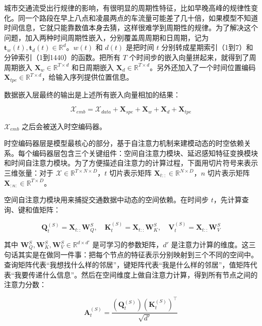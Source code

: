 城市交通流受出行规律的影响，有很明显的周期性特征，比如早晚高峰的规律性变化。同一个路段在早上八点和凌晨两点的车流量可能差了几十倍，如果模型不知道时间信息，它就只能靠数值本身去猜，这样很难学到周期性的规律。为了解决这个问题，加入两种时间周期性嵌入，分别覆盖周周期和日周期，记为 $\boldsymbol{t}_w(t), \boldsymbol{t}_d(t) \in \mathbb{R}^d$。$w(t)$ 和 $d(t)$ 是把时间 $t$ 分别转成星期索引（1到7）和分钟索引（1到1440）的函数。把所有 $T$ 个时间步的嵌入向量拼起来，就得到了周周期嵌入 $\boldsymbol{X}_w \in \mathbb{R}^{T \times d}$ 和日周期嵌入 $\boldsymbol{X}_d \in \mathbb{R}^{T \times d}$。另外还加入了一个时间位置编码 $\boldsymbol{X}_{tpe} \in \mathbb{R}^{T \times d}$，给输入序列提供位置信息。

数据嵌入层最终的输出是上述所有嵌入向量相加的结果：

\begin{equation}
\mathcal{X}_{emb} = \mathcal{X}_{data} + \boldsymbol{X}_{spe} + \boldsymbol{X}_w + \boldsymbol{X}_d + \boldsymbol{X}_{tpe}
\end{equation}

$\mathcal{X}_{emb}$ 之后会被送入时空编码器。

时空编码器层是模型最核心的部分，基于自注意力机制来建模动态的时空依赖关系。每个编码器层包含三个关键组件：空间自注意力模块、延迟感知特征变换模块和时间自注意力模块。为了方便描述自注意力的计算过程，下面用切片符号来表示三维张量：对于 $\mathcal{X} \in \mathbb{R}^{T \times N \times D}$，$t$ 切片表示矩阵 $\boldsymbol{X}_{t::} \in \mathbb{R}^{N \times D}$，$n$ 切片表示矩阵 $\boldsymbol{X}_{:n:} \in \mathbb{R}^{T \times D}$。

空间自注意力模块用来捕捉交通数据中动态的空间依赖。在时间步 $t$，先计算查询、键和值矩阵：

\begin{equation}
\boldsymbol{Q}_t^{(S)} = \boldsymbol{X}_{t::} \boldsymbol{W}_Q^S, \quad
\boldsymbol{K}_t^{(S)} = \boldsymbol{X}_{t::} \boldsymbol{W}_K^S, \quad
\boldsymbol{V}_t^{(S)} = \boldsymbol{X}_{t::} \boldsymbol{W}_V^S
\end{equation}

其中 $\boldsymbol{W}_Q^S, \boldsymbol{W}_K^S, \boldsymbol{W}_V^S \in \mathbb{R}^{d \times d'}$ 是可学习的参数矩阵，$d'$ 是注意力计算的维度。这三句话其实是在做同一件事：把每个节点的特征表示分别映射到三个不同的空间中。查询矩阵代表“我想找什么样的邻居”，键矩阵代表“我是什么样的邻居”，值矩阵代表“我要传递什么信息”。然后在空间维度上做自注意力计算，得到所有节点之间的注意力分数：

\begin{equation}
\boldsymbol{A}_t^{(S)} = \frac{(\boldsymbol{Q}_t^{(S)})(\boldsymbol{K}_t^{(S)})^\top}{\sqrt{d'}}
\end{equation}

